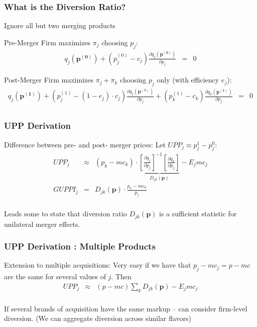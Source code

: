 \documentclass[xcolor=pdftex,dvipsnames,table,mathserif]{beamer}
\begin{document}
\begin{frame}
\frametitle{What is the Diversion Ratio?}
\small
Ignore all but two merging products
\begin{block}{Pre-Merger}
Firm maximizes $\pi_j$ choosing $p_j$:
\begin{eqnarray*}
q_j(\mathbf{p^{(0)}}) + (p_j^{(0)} - c_j) \frac{\partial q_j(\mathbf{p^{(0)}})}{\partial p_j} &=& 0 
\end{eqnarray*}
\end{block}
\small
\begin{block}{Post-Merger}
Firm maximizes $\pi_j+\pi_k$ choosing $p_j$ only (with efficiency $e_j$):
\begin{eqnarray*}
q_j(\mathbf{p^{(1)}}) + (p_j^{(1)} - (1-e_j)\cdot c_j) \frac{\partial q_j(\mathbf{p^{(1)}})}{\partial p_j}  + (p_k^{(1)} - c_k) \frac{\partial q_k(\mathbf{p^{(1)}})}{\partial p_j}  &=& 0 \\
\end{eqnarray*}
\end{block}
\end{frame}

\begin{frame}
\frametitle{UPP Derivation}
\begin{block}{Difference between pre- and post- merger prices:}
Let $UPP_j \approx p_j^{1} -p_j^{0}$: 
\begin{eqnarray*}
UPP_j &\approx& (p_k -mc_k) \cdot \underbrace{\left[\frac{\partial q_j }{\partial p_j}\right]^{-1}  \left[\frac{\partial q_k }{\partial p_j} \right]}_{D_{jk}(\mathbf{p})} - E_j mc_j \\
GUPPI_j &=& D_{jk}(\mathbf{p}) \cdot  \frac{p_k - mc_k}{p_j} \\
\end{eqnarray*}
\end{block}
Leads some to state that diversion ratio $D_{jk}(\mathbf{p})$ is a sufficient statistic for unilateral merger effects.
\end{frame}

\begin{frame}
\frametitle{UPP Derivation : Multiple Products}
\begin{block}{Extension to multiple acquisitions:}
Very easy if we have that $p_j - mc_j = p - mc$ are the same for several values of $j$.  Then
\begin{eqnarray*}
UPP_j &\approx& (p - mc) \sum_k D_{jk}(\mathbf{p}) -  E_j mc_j \\
\end{eqnarray*}
\end{block}
If several brands of acquisition have the same markup -- can consider firm-level diversion. (We can aggregate diversion across similar flavors)
\end{frame}
\end{document}
